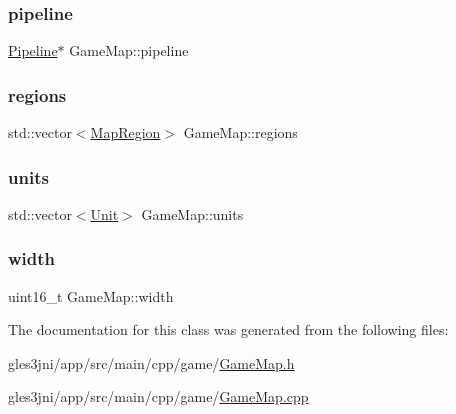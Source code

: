 \mbox{\label{class_game_map_a0fd10cff6ef3c8b1b96eb7f3cabc8946}} 
\subsubsection{\texorpdfstring{pipeline}{pipeline}}
{\footnotesize\ttfamily \hyperlink{class_pipeline}{Pipeline}$\ast$ Game\+Map\+::pipeline\hspace{0.3cm}{\ttfamily [private]}}

\mbox{\label{class_game_map_a8210c97d906cc6ab2d9f98915504ea6a}} 
\subsubsection{\texorpdfstring{regions}{regions}}
{\footnotesize\ttfamily std\+::vector$<$\hyperlink{class_map_region}{Map\+Region}$>$ Game\+Map\+::regions\hspace{0.3cm}{\ttfamily [private]}}

\mbox{\label{class_game_map_a3620b68d7f24cfb57e3083acdf534ff6}} 
\subsubsection{\texorpdfstring{units}{units}}
{\footnotesize\ttfamily std\+::vector$<$\hyperlink{class_unit}{Unit}$>$ Game\+Map\+::units\hspace{0.3cm}{\ttfamily [private]}}

\mbox{\label{class_game_map_a827aedef06be5c3115eeea3ac8e68b72}} 
\subsubsection{\texorpdfstring{width}{width}}
{\footnotesize\ttfamily uint16\+\_\+t Game\+Map\+::width\hspace{0.3cm}{\ttfamily [private]}}



The documentation for this class was generated from the following files\+:\begin{DoxyCompactItemize}
\item 
gles3jni/app/src/main/cpp/game/\hyperlink{_game_map_8h}{Game\+Map.\+h}\item 
gles3jni/app/src/main/cpp/game/\hyperlink{_game_map_8cpp}{Game\+Map.\+cpp}\end{DoxyCompactItemize}
